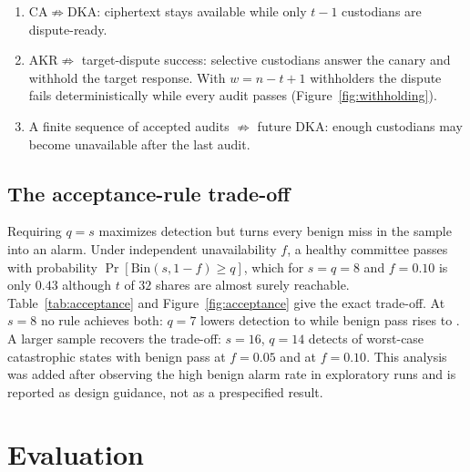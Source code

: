 \documentclass[10pt]{article}
\makeatletter
\newcommand{\DKA}{\mathrm{DKA}}
\newcommand{\CA}{\mathrm{CA}}
\newcommand{\AKR}{\mathrm{AKR}}
\newcommand{\FloatBarrier}{\par\begingroup\let\@elt\relax\edef\@tempa{\@botlist\@deferlist\@dbldeferlist}\ifx\@tempa\@empty\else\clearpage\fi\endgroup}
\makeatother
\begin{document}
\begin{enumerate}
  \item $\CA\not\Rightarrow\DKA$: ciphertext stays available while only $t-1$ custodians are dispute-ready.
  \item $\AKR\not\Rightarrow$ target-dispute success: selective custodians answer the canary and withhold the target response. With $w=n-t+1$ withholders the dispute fails deterministically while every audit passes (Figure~\ref{fig:withholding}).
  \item A finite sequence of accepted audits $\not\Rightarrow$ future $\DKA$: enough custodians may become unavailable after the last audit.
\end{enumerate}

\subsection{The acceptance-rule trade-off}

Requiring $q=s$ maximizes detection but turns every benign miss in the sample into an alarm. Under independent unavailability $f$, a healthy committee passes with probability $\Pr[\mathrm{Bin}(s,1-f)\geq q]$, which for $s=q=8$ and $f=0.10$ is only $0.43$ although $t$ of $32$ shares are almost surely reachable. Table~\ref{tab:acceptance} and Figure~\ref{fig:acceptance} give the exact trade-off. At $s=8$ no rule achieves both: $q=7$ lowers detection to \RAccEightSevenDet{} while benign pass rises to \RAccEightSevenPass{}. A larger sample recovers the trade-off: $s=16$, $q=14$ detects \RAccSixteenFourteenDet{} of worst-case catastrophic states with benign pass \RAccSixteenFourteenPassFive{} at $f=0.05$ and \RAccSixteenFourteenPassTen{} at $f=0.10$. This analysis was added after observing the high benign alarm rate in exploratory runs and is reported as design guidance, not as a prespecified result.

\begin{table}[!htbp]
\centering
\caption{Exact acceptance-rule trade-off at $n=32$, $t=22$: worst-case catastrophic detection ($r=t-1$) versus the probability that a healthy committee passes under IID unavailability $f$. Post hoc analysis.}
\label{tab:acceptance}
\small

\end{table}


\FloatBarrier
\section{Evaluation}\label{sec:evaluation}
\end{document}
